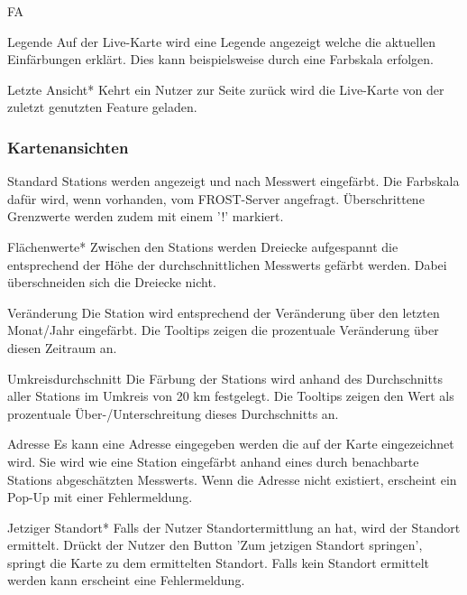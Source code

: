 \begin{Kriterien}{FA}
 \item[Legende]
  Auf der \gls{Live-Karte} wird eine Legende angezeigt welche die aktuellen Einfärbungen erklärt.
  Dies kann beispielsweise durch eine Farbskala erfolgen.

 \item[Letzte Ansicht*]
  Kehrt ein Nutzer zur Seite zurück wird die \gls{Live-Karte} von der zuletzt genutzten \gls{Feature} geladen.

 \subsubsection*{Kartenansichten}

 \item[Standard]
  \glspl{Station} werden angezeigt und nach \gls{Messwert} eingefärbt. 
  Die Farbskala dafür wird, wenn vorhanden, vom \gls{FROST-Server} angefragt.
  Überschrittene Grenzwerte werden zudem mit einem '!' markiert.

 \item[Flächenwerte*]
   Zwischen den \glspl{Station} werden Dreiecke aufgespannt die entsprechend der Höhe der durchschnittlichen \glspl{Messwert} gefärbt werden.
   Dabei überschneiden sich die Dreiecke nicht.

 \item[Veränderung]
   Die \gls{Station} wird entsprechend der Veränderung über den letzten Monat/Jahr eingefärbt.
   Die \glspl{Tooltip} zeigen die prozentuale Veränderung über diesen Zeitraum an.

 \item[Umkreisdurchschnitt]
  Die Färbung der \glspl{Station} wird anhand des Durchschnitts aller \glspl{Station} im Umkreis von 20 km festgelegt.
  Die \glspl{Tooltip} zeigen den Wert als prozentuale Über-/Unterschreitung dieses Durchschnitts an. 

 \item[Adresse]
   Es kann eine Adresse eingegeben werden die auf der Karte eingezeichnet wird.
   Sie wird wie eine \gls{Station} eingefärbt anhand eines durch benachbarte \glspl{Station} abgeschätzten \gls{Messwert}s.
   Wenn die Adresse nicht existiert, erscheint ein \gls{Pop-Up} mit einer Fehlermeldung.
   
   \item[Jetziger Standort*] Falls der Nutzer Standortermittlung an hat, wird der Standort ermittelt. 
    Drückt der Nutzer den Button 'Zum jetzigen Standort springen', springt die Karte zu dem ermittelten Standort. 
    Falls kein Standort ermittelt werden kann erscheint eine Fehlermeldung.


\end{Kriterien}
